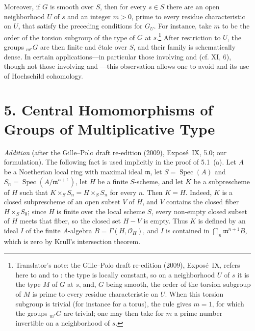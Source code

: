 Moreover, if \(G\) is smooth over \(S\), then for every \(s\in S\) there
are an open neighborhood \(U\) of \(s\) and an integer \(m>0\), prime
to every residue characteristic on \(U\), that satisfy the preceding
conditions for \(G_U\). For instance, take \(m\) to be the order of the
torsion subgroup of the type of \(G\) at \(s\).\footnote{Translator's
note: the Gille--Polo draft re-edition (2009), Expos\'e~IX, refers here to
 and to
: the type is
locally constant, so on a neighborhood \(U\) of \(s\) it is the type \(M\)
of \(G\) at \(s\), and, \(G\) being smooth, the order of the torsion
subgroup of \(M\) is prime to every residue characteristic on \(U\). When
this torsion subgroup is trivial (for instance for a torus), the rule
gives \(m=1\), for which the groups \({}_{m^r}G\) are trivial; one may
then take for \(m\) a prime number invertible on a neighborhood of
\(s\).} After restriction to
\(U\), the groups \({}_{m^r}G\) are then
finite and \'etale over \(S\), and their family is schematically dense.
In certain applications---in particular those involving
 and
 (cf. XI, 6),
though not those involving 
and ---this
observation allows one to avoid
 and its use of Hochschild
cohomology.

\section*{5. Central Homomorphisms of Groups of Multiplicative Type}

\medskip
\noindent
\emph{Addition} (after the Gille--Polo draft re-edition (2009),
Expos\'e~IX, 5.0; our formulation). The following fact is used implicitly
in the proof of 5.1~(a). Let \(A\) be a Noetherian local ring with maximal
ideal \(\mathfrak m\), let \(S=\operatorname{Spec}(A)\) and
\(S_n=\operatorname{Spec}(A/\mathfrak m^{n+1})\), let \(H\) be a finite
\(S\)-scheme, and let \(K\) be a subprescheme of \(H\) such that
\(K\times_SS_n=H\times_SS_n\) for every \(n\). Then \(K=H\). Indeed, \(K\)
is a closed subprescheme of an open subset \(V\) of \(H\), and \(V\)
contains the closed fiber \(H\times_SS_0\); since \(H\) is finite over the
local scheme \(S\), every non-empty closed subset of \(H\) meets that
fiber, so the closed set \(H-V\) is empty. Thus \(K\) is defined by an
ideal \(I\) of the finite \(A\)-algebra \(B=\Gamma(H,\mathscr O_H)\), and
\(I\) is contained in \(\bigcap_n\mathfrak m^{n+1}B\), which is zero by
Krull's intersection theorem.

